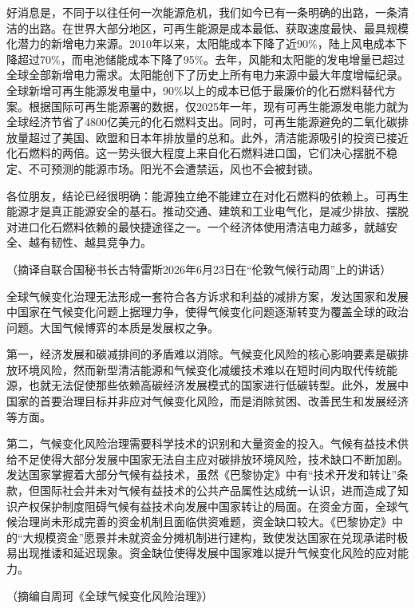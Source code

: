 \documentclass[11pt,a4paper]{ctexart}
\begin{document}
\begin{materialtext}
好消息是，不同于以往任何一次能源危机，我们如今已有一条明确的出路，一条清洁的出路。在世界大部分地区，可再生能源是成本最低、获取速度最快、最具规模化潜力的新增电力来源。2010年以来，太阳能成本下降了近90\%，陆上风电成本下降超过70\%，而电池储能成本下降了95\%。去年，风能和太阳能的发电增量已超过全球全部新增电力需求。太阳能创下了历史上所有电力来源中最大年度增幅纪录。全球新增可再生能源发电量中，90\%以上的成本已低于最廉价的化石燃料替代方案。根据国际可再生能源署的数据，仅2025年一年，现有可再生能源发电能力就为全球经济节省了4800亿美元的化石燃料支出。同时，可再生能源避免的二氧化碳排放量超过了美国、欧盟和日本年排放量的总和。此外，清洁能源吸引的投资已接近化石燃料的两倍。这一势头很大程度上来自化石燃料进口国，它们决心摆脱不稳定、不可预测的能源市场。阳光不会遭禁运，风也不会被封锁。

各位朋友，结论已经很明确：能源独立绝不能建立在对化石燃料的依赖上。可再生能源才是真正能源安全的基石。推动交通、建筑和工业电气化，是减少排放、摆脱对进口化石燃料依赖的最快捷途径之一。一个经济体使用清洁电力越多，就越安全、越有韧性、越具竞争力。
\end{materialtext}
\begin{flushright}（摘译自联合国秘书长古特雷斯2026年6月23日在“伦敦气候行动周”上的讲话）\end{flushright}

\begin{materialtext}
全球气候变化治理无法形成一套符合各方诉求和利益的减排方案，发达国家和发展中国家在气候变化问题上据理力争，使得气候变化问题逐渐转变为覆盖全球的政治问题。大国气候博弈的本质是发展权之争。

第一，经济发展和碳减排间的矛盾难以消除。气候变化风险的核心影响要素是碳排放环境风险，然而新型清洁能源和气候变化减缓技术难以在短时间内取代传统能源，也就无法促使那些依赖高碳经济发展模式的国家进行低碳转型。此外，发展中国家的首要治理目标并非应对气候变化风险，而是消除贫困、改善民生和发展经济等方面。

第二，气候变化风险治理需要科学技术的识别和大量资金的投入。气候有益技术供给不足使得大部分发展中国家无法自主应对碳排放环境风险，技术缺口不断加剧。发达国家掌握着大部分气候有益技术，虽然《巴黎协定》中有“技术开发和转让”条款，但国际社会并未对气候有益技术的公共产品属性达成统一认识，进而造成了知识产权保护制度阻碍气候有益技术向发展中国家转让的局面。在资金方面，全球气候治理尚未形成完善的资金机制且面临供资难题，资金缺口较大。《巴黎协定》中的“大规模资金”愿景并未就资金分摊机制进行建构，致使发达国家在兑现承诺时极易出现推诿和延迟现象。资金缺位使得发展中国家难以提升气候变化风险的应对能力。
\end{materialtext}
\begin{flushright}（摘编自周珂《全球气候变化风险治理》）\end{flushright}
\end{document}
